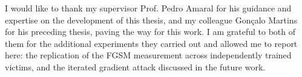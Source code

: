 
%

\begin{ntacknowledgements}

I would like to thank my supervisor Prof. Pedro Amaral for his guidance
and expertise on
the development of this thesis, and my colleague Gonçalo Martins for
his preceding thesis, paving the way for this work. I am grateful to both of them for
the additional experiments they carried out and allowed me to report here: the
replication of the FGSM measurement across independently trained victims, and the
iterated gradient attack discussed in the future work.


\end{ntacknowledgements}